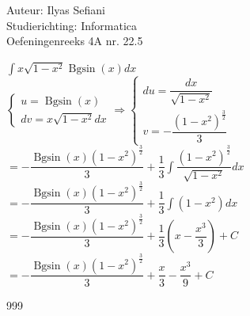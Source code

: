 \documentclass[a4paper]{article}
\begin{document}
\noindent \large Auteur: Ilyas Sefiani \\
\noindent \large Studierichting: Informatica\\
\noindent \large Oefeningenreeks 4A nr. 22.5\\

\medskip

\normalsize

$\displaystyle\int x\sqrt{1-x^2}\operatorname{Bgsin}(x)dx$\\

$\left \{
\begin{array}{l}
u = \operatorname{Bgsin}(x) \\
dv = x\sqrt{1-x^2}dx
\end{array}
\right .
\Rightarrow
\left \{
\begin{array}{l}
du = \dfrac{dx}{\sqrt{1-x^2}} \\
v = -\dfrac{(1-x^2)^{\tfrac{3}{2}}}{3}
\end{array}
\right .$\\

$=-\dfrac{\operatorname{Bgsin}(x)(1-x^2)^{\tfrac{3}{2}}}{3} + \dfrac{1}{3}\displaystyle\int \dfrac{(1-x^2)^{\tfrac{3}{2}}}{\sqrt{1-x^2}}dx$\\

$=-\dfrac{\operatorname{Bgsin}(x)(1-x^2)^{\tfrac{3}{2}}}{3} + \dfrac{1}{3}\displaystyle\int (1-x^2)dx$\\

$=-\dfrac{\operatorname{Bgsin}(x)(1-x^2)^{\tfrac{3}{2}}}{3} + \dfrac{1}{3}\left(x-\dfrac{x^3}{3}\right)+C$\\

$=-\dfrac{\operatorname{Bgsin}(x)(1-x^2)^{\tfrac{3}{2}}}{3} + \dfrac{x}{3}-\dfrac{x^3}{9}+C$\\

\begin{thebibliography}{999}
\end{thebibliography}
\end{document}

